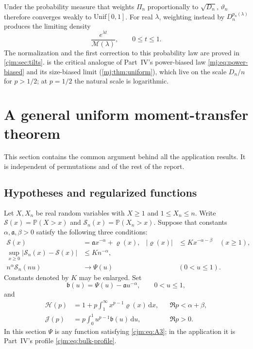 \documentclass[11pt,a4paper]{article}
\theoremstyle{definition}\newaliascnt{definition}{theorem}
\theoremstyle{remark}\newaliascnt{remark}{theorem}
\newcommand{\dd}{\mathrm d}
\newcommand{\ljP}{\mathbb P}
\begin{document}
Under the probability measure that weights $\Pi_n$ proportionally to
$\sqrt{D_n}$, $\vartheta_n$ therefore converges weakly to
$\mathrm{Unif}[0,1]$. For real $\lambda$, weighting instead by
$D_n^{p_n(\lambda)}$ produces the limiting density
\begin{equation}
 \frac{e^{\lambda t}}{\mathcal M(\lambda)},\qquad 0\le t\le1.
 \label{cjm:eq:tilted-density}
\end{equation}
The normalization and the first correction to this probability law are
proved in \cref{cjm:sec:tilts}.  is the critical
analogue of Part~IV's power-biased law \eqref{mj:eq:power-biased} and its
size-biased limit (\cref{mj:thm:uniform}), which live on the scale $D_n/n$
for $p>1/2$; at $p=1/2$ the natural scale is logarithmic.

\section{A general uniform moment-transfer theorem}
\label{cjm:sec:transfer}
This section contains the common argument behind all the application
results. It is independent of permutations and of the rest of the report.

\subsection{Hypotheses and regularized functions}
Let $X,X_n$ be real random variables with $X\ge1$ and $1\le X_n\le n$.
Write $\mathcal S(x)=\ljP(X>x)$ and $\mathcal S_n(x)=\ljP(X_n>x)$. Suppose that
constants $\alpha,\mathfrak a,\beta>0$ satisfy the following three
conditions:
\begin{align}
 \mathcal S(x)&=\mathfrak a x^{-\alpha}+\varrho(x),&
 |\varrho(x)|&\le K x^{-\alpha-\beta}\quad(x\ge1),
 \label{cjm:eq:A1}\\
 \sup_{x\ge0}|\mathcal S_n(x)-\mathcal S(x)|&\le K n^{-\alpha},
 \label{cjm:eq:A2}\\
 n^\alpha \mathcal S_n(nu)&\longrightarrow\Psi(u)
 &&(0<u\le1).
 \label{cjm:eq:A3}
\end{align}
Constants denoted by $K$ may be enlarged. Set
\begin{equation}
 \mathfrak b(u)=\Psi(u)-\mathfrak a u^{-\alpha},\qquad 0<u\le1,
 \label{cjm:eq:b-general}
\end{equation}
and
\begin{align}
 \mathcal H(p)&=1+p\int_1^\infty x^{p-1}\varrho(x)\,\dd x,
              &&\Re p<\alpha+\beta,
 \label{cjm:eq:H-general}\\
 \mathcal J(p)&=p\int_0^1u^{p-1}\mathfrak b(u)\,\dd u,
              &&\Re p>0.
 \label{cjm:eq:J-general}
\end{align}
In this section $\Psi$ is any function satisfying \eqref{cjm:eq:A3}; in the
application it is Part~IV's profile \eqref{cjm:eq:bulk-profile}.
\end{document}
